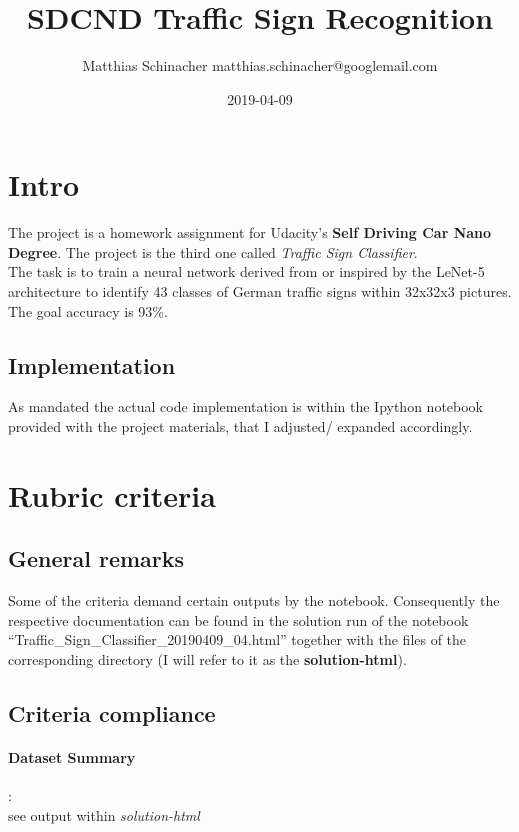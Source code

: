 \documentclass[a4paper]{article}
\title{SDCND Traffic Sign Recognition}
\date{2019-04-09}
\author{Matthias Schinacher matthias.schinacher@googlemail.com}
\begin{document}
\maketitle
\tableofcontents
\newpage

\section{Intro}
The project is a homework assignment for Udacity's \textbf{Self Driving Car Nano Degree}.
The project is the third one called \textit{Traffic Sign Classifier}.
\\
The task is to train a neural network derived from or inspired by the LeNet-5 architecture
to identify 43 classes of German traffic signs within 32x32x3 pictures.
The goal accuracy is 93\%.

\subsection{Implementation}
As mandated the actual code implementation is within the Ipython notebook provided
with the project materials, that I adjusted/ expanded accordingly.

\section{Rubric criteria}
\subsection{General remarks}
Some of the criteria demand certain outputs by the notebook. Consequently the
respective documentation can be found in the solution run of the notebook
\enquote{Traffic\_Sign\_Classifier\_20190409\_04.html} together with the
files of the corresponding directory (I will refer to it as the \textbf{solution-html}).

\subsection{Criteria compliance}
\paragraph{Dataset Summary}
:\\
see output within \textit{solution-html}
\end{document}
